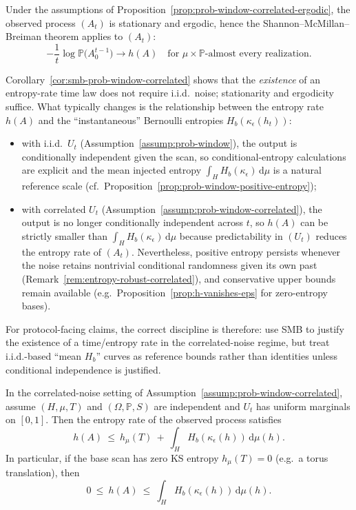 \begin{corollary}\label{cor:smb-prob-window-correlated}
Under the assumptions of Proposition~\ref{prop:prob-window-correlated-ergodic}, the observed process $(A_t)$ is stationary and ergodic, hence the Shannon--McMillan--Breiman theorem applies to $(A_t)$:
\[
-\frac{1}{t}\log \mathbb{P}\bigl(A_0^{t-1}\bigr)\to h(A)
\quad\text{for }\mu\times\mathbb{P}\text{-almost every realization.}
\]
\cite{Walters1982,Petersen1983}
\end{corollary}

\begin{remark}\label{rem:correlated-noise-what-changes}
Corollary~\ref{cor:smb-prob-window-correlated} shows that the \emph{existence} of an entropy-rate time law does not require i.i.d.\ noise; stationarity and ergodicity suffice. What typically changes is the relationship between the entropy rate $h(A)$ and the ``instantaneous'' Bernoulli entropies $H_b(\kappa_\epsilon(h_t))$:
\begin{itemize}[leftmargin=*,itemsep=2pt]
  \item with i.i.d.\ $U_t$ (Assumption~\ref{assump:prob-window}), the output is conditionally independent given the scan, so conditional-entropy calculations are explicit and the mean injected entropy $\int_H H_b(\kappa_\epsilon)\,\mathrm{d}\mu$ is a natural reference scale (cf.\ Proposition~\ref{prop:prob-window-positive-entropy});
  \item with correlated $U_t$ (Assumption~\ref{assump:prob-window-correlated}), the output is no longer conditionally independent across $t$, so $h(A)$ can be strictly smaller than $\int_H H_b(\kappa_\epsilon)\,\mathrm{d}\mu$ because predictability in $(U_t)$ reduces the entropy rate of $(A_t)$. Nevertheless, positive entropy persists whenever the noise retains nontrivial conditional randomness given its own past (Remark~\ref{rem:entropy-robust-correlated}), and conservative upper bounds remain available (e.g.\ Proposition~\ref{prop:h-vanishes-eps} for zero-entropy bases).
\end{itemize}
For protocol-facing claims, the correct discipline is therefore: use SMB to justify the existence of a time/entropy rate in the correlated-noise regime, but treat i.i.d.-based ``mean $H_b$'' curves as reference bounds rather than identities unless conditional independence is justified.
\end{remark}

\begin{proposition}\label{prop:h-upper-bound-correlated}
In the correlated-noise setting of Assumption~\ref{assump:prob-window-correlated}, assume $(H,\mu,T)$ and $(\Omega,\mathbb{P},S)$ are independent and $U_t$ has uniform marginals on $[0,1]$. Then the entropy rate of the observed process satisfies
\[
h(A)\ \le\ h_\mu(T)\ +\ \int_H H_b(\kappa_\epsilon(h))\,\mathrm{d}\mu(h).
\]
In particular, if the base scan has zero KS entropy $h_\mu(T)=0$ (e.g.\ a torus translation), then
\[
0\ \le\ h(A)\ \le\ \int_H H_b(\kappa_\epsilon(h))\,\mathrm{d}\mu(h).
\]
\end{proposition}

